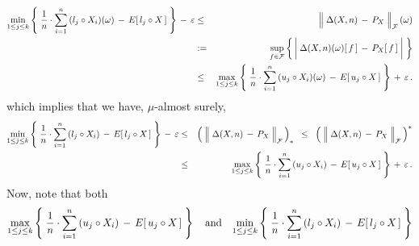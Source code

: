 \begin{eqnarray*}
	\underset{1\leq j \leq k}{\min}\left\{\;
		\dfrac{1}{n}\cdot \overset{n}{\underset{i=1}{\sum}}\,(l_{j} \circ X_{i})(\omega)
		\,\overset{{\color{white}+}}{-}\,
		E[\,l_{j} \circ X\,]
		\;\right\}
	\,\overset{{\color{white}+}}{-}\,
	\varepsilon
& \leq &
	\left\Vert\;\Delta(X,n) \,\overset{{\color{white}.}}{-}\, P_{X}\;\right\Vert_{\mathcal{F}}(\omega)
\\
& := &
	\underset{f\in\mathcal{F}}{\sup}\left\{\,
		\left\vert\; \Delta(X,n)(\omega)[\,f\,]\,\overset{{\color{white}+}}{-}\,P_{X}[\,f\,] \;\right\vert
	\;\right\}
\\
& \leq &
	\underset{1\leq j \leq k}{\max}\left\{\;
		\dfrac{1}{n}\cdot \overset{n}{\underset{i=1}{\sum}}\,(u_{j} \circ X_{i})(\omega)
		\,\overset{{\color{white}+}}{-}\,
		E[\,u_{j} \circ X\,]
		\;\right\}
	\,\overset{{\color{white}+}}{+}\,
	\varepsilon\,.
\end{eqnarray*}
which implies that we have, $\mu$-almost surely,
\begin{eqnarray*}
	\underset{1\leq j \leq k}{\min}\left\{\;
		\dfrac{1}{n}\cdot \overset{n}{\underset{i=1}{\sum}}\,(l_{j} \circ X_{i})
		\,\overset{{\color{white}+}}{-}\,
		E[\,l_{j} \circ X\,]
		\;\right\}
	\,\overset{{\color{white}+}}{-}\,
	\varepsilon
& \leq &
	\left(\;\left\Vert\;\Delta(X,n) \,\overset{{\color{white}.}}{-}\, P_{X}\;\right\Vert_{\mathcal{F}}\,\right)_{*}
\;\; \leq \;\;
	\left(\;\left\Vert\;\Delta(X,n) \,\overset{{\color{white}.}}{-}\, P_{X}\;\right\Vert_{\mathcal{F}}\,\right)^{*}
\\
& \leq &
	\underset{1\leq j \leq k}{\max}\left\{\;
		\dfrac{1}{n}\cdot \overset{n}{\underset{i=1}{\sum}}\,(u_{j} \circ X_{i})
		\,\overset{{\color{white}+}}{-}\,
		E[\,u_{j} \circ X\,]
		\;\right\}
	\,\overset{{\color{white}+}}{+}\,
	\varepsilon\,.
\end{eqnarray*}
Now, note that both
\begin{equation*}
	\underset{1\leq j \leq k}{\max}\left\{\;
		\dfrac{1}{n}\cdot \overset{n}{\underset{i=1}{\sum}}\,(u_{j} \circ X_{i})
		\,\overset{{\color{white}+}}{-}\,
		E[\,u_{j} \circ X\,]
	\;\right\}
\quad\textnormal{and}\quad
	\underset{1\leq j \leq k}{\min}\left\{\;
		\dfrac{1}{n}\cdot \overset{n}{\underset{i=1}{\sum}}\,(l_{j} \circ X_{i})
		\,\overset{{\color{white}+}}{-}\,
		E[\,l_{j} \circ X\,]
	\;\right\}
\end{equation*}
